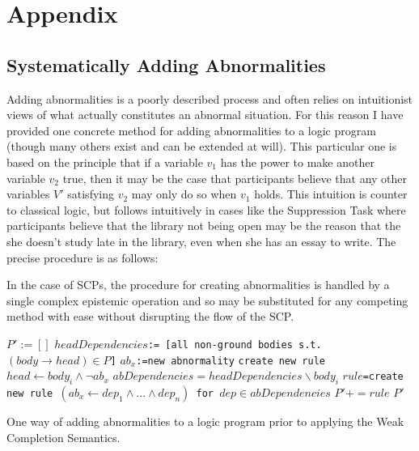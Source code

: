 \documentclass{article}
\begin{document}



\newpage
\section{Appendix}
\subsection{Systematically Adding Abnormalities} \label{ssec:addAbnormalities}
Adding abnormalities is a poorly described process and often relies on intuitionist views of what actually constitutes an abnormal situation. For this reason I have provided one concrete method for adding abnormalities to a logic program (though many others exist and can be extended at will). This particular one is based on the principle that if a variable $v_1$ has the power to make another variable $v_2$ true, then it may be the case that participants believe that any other variables $V'$ satisfying $v_2$ may only do so when $v_1$ holds. This intuition is counter to classical logic, but follows intuitively in cases like the Suppression Task where participants believe that the library not being open may be the reason that the she doesn't study late in the library, even when she has an essay to write. The precise procedure is as follows:


In the case of SCPs, the procedure for creating abnormalities is handled by a single complex epistemic operation and so may be substituted for any competing method with ease without disrupting the flow of the SCP.



\begin{algorithm}
\begin{algorithmic}[1]
\State \texttt{$P':=[]$}
\State \texttt{$headDependencies$:= [all non-ground bodies s.t.$(body \rightarrow head) \in P$]}
\State \texttt{$ab_{x}$:=new abnormality} 
\State \texttt{create new rule $head \leftarrow body_i \land \lnot ab_x$} 
\State \texttt {$abDependencies = headDependencies \backslash body_i$}
\State \texttt{$rule$=create new rule $(ab_x \leftarrow dep_1 \land ... \land dep_n)$ for $dep \in abDependencies$}
\State $P'+=rule$
\EndFor
\EndFor
\State \Return $P'$
\EndFunction
\end{algorithmic}
\caption{One way of adding abnormalities to a logic program prior to applying the Weak Completion Semantics.}
\label{alg:addAbnormalities}
\end{algorithm}
\end{document}
